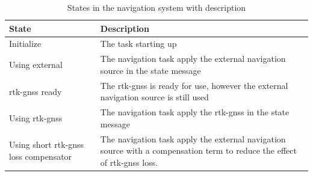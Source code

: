 \begin{table}[H]
\begin{tabular}{ | p{3cm} | p{8cm} |}
	\hline 
	\textbf{State}						& \textbf{Description} \\ \hline
	Initialize							& The task starting up\\ \hline
	Using external						& The navigation task apply the external navigation source in the state message\\ \hline
	\gls{rtk-gnss} ready							& The \gls{rtk-gnss} is ready for use, however the external navigation source is still used\\ \hline
	Using \gls{rtk-gnss}							& The navigation task apply the \gls{rtk-gnss} in the state message\\ \hline
	Using short \gls{rtk-gnss} loss compensator	& The navigation task apply the external navigation source with a compensation term to reduce the effect of \gls{rtk-gnss} loss. \\ \hline
\end{tabular}
\caption{States in the navigation system with description}
\label{Tb:StateDescription}
\end{table}
